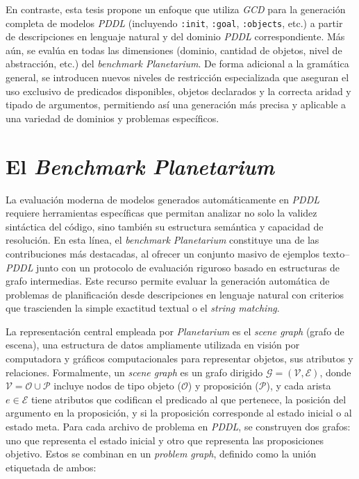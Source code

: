 En contraste, esta tesis propone un enfoque que utiliza \textit{GCD} para la generación completa de modelos \textit{PDDL} (incluyendo \texttt{:init}, \texttt{:goal}, \texttt{:objects}, etc.) a partir de descripciones en lenguaje natural y del dominio \textit{PDDL} correspondiente. Más aún, se evalúa en todas las dimensiones (dominio, cantidad de objetos, nivel de abstracción, etc.) del \textit{benchmark Planetarium}. De forma adicional a la gramática general, se introducen nuevos niveles de restricción especializada que aseguran el uso exclusivo de predicados disponibles, objetos declarados y la correcta aridad y tipado de argumentos, permitiendo así una generación más precisa y aplicable a una variedad de dominios y problemas específicos.

\section{El \textit{Benchmark Planetarium}}

La evaluación moderna de modelos generados automáticamente en \textit{PDDL} requiere herramientas específicas que permitan analizar no solo la validez sintáctica del código, sino también su estructura semántica y capacidad de resolución. En esta línea, el \textit{benchmark Planetarium} \parencite{zuo2024planetarium} constituye una de las contribuciones más destacadas, al ofrecer un conjunto masivo de ejemplos texto--\textit{PDDL} junto con un protocolo de evaluación riguroso basado en estructuras de grafo intermedias. Este recurso permite evaluar la generación automática de problemas de planificación desde descripciones en lenguaje natural con criterios que trascienden la simple exactitud textual o el \textit{string matching}.

La representación central empleada por \textit{Planetarium} es el \textit{scene graph} (grafo de escena), una estructura de datos ampliamente utilizada en visión por computadora y gráficos computacionales para representar objetos, sus atributos y relaciones. Formalmente, un \textit{scene graph} es un grafo dirigido $\mathcal{G} = (\mathcal{V}, \mathcal{E})$, donde $\mathcal{V} = \mathcal{O} \cup \mathcal{P}$ incluye nodos de tipo objeto ($\mathcal{O}$) y proposición ($\mathcal{P}$), y cada arista $e \in \mathcal{E}$ tiene atributos que codifican el predicado al que pertenece, la posición del argumento en la proposición, y si la proposición corresponde al estado inicial o al estado meta. Para cada archivo de problema en \textit{PDDL}, se construyen dos grafos: uno que representa el estado inicial y otro que representa las proposiciones objetivo. Estos se combinan en un \textit{problem graph}, definido como la unión etiquetada de ambos: 

